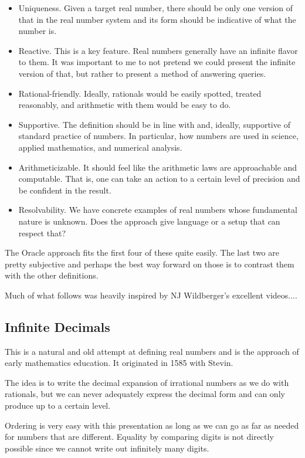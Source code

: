 \documentclass[12pt]{article}
\theoremstyle{remark}
\begin{document}
\begin{itemize}
    \item Uniqueness. Given a target real number, there should be only one version of that in the real number system and its form should be indicative of what the number is. 
    \item Reactive. This is a key feature. Real numbers generally have an infinite flavor to them. It was important to me to not pretend we could present the infinite version of that, but rather to present a method of answering queries. 
    \item Rational-friendly. Ideally, rationals would be easily spotted, treated reasonably, and arithmetic with them would be easy to do. 
    \item Supportive. The definition should be in line with and, ideally, supportive of standard practice of numbers. In particular, how numbers are used in science, applied mathematics, and numerical analysis. 
    \item Arithmeticizable. It should feel like the arithmetic laws are approachable and computable. That is, one can take an action to a certain level of precision and be confident in the result.
    \item Resolvability. We have concrete examples of real numbers whose fundamental nature is unknown. Does the approach give language or a setup that can respect that? 
\end{itemize}

The Oracle approach fits the first four of these quite easily. The last two are pretty subjective and perhaps the best way forward on those is to contrast them with the other definitions. 

Much of what follows was heavily inspired by NJ Wildberger's excellent videos....


\subsection{Infinite Decimals}

This is a natural and old attempt at defining real numbers and is the approach of early mathematics education. It originated in 1585 with Stevin. 

The idea is to write the decimal expansion of irrational numbers as we do with rationals, but we can never adequately express the decimal form and can only produce up to a certain level. 

Ordering is very easy with this presentation as long as we can go as far as needed for numbers that are different. Equality by comparing digits is not directly possible since we cannot write out infinitely many digits. 
\end{document}
